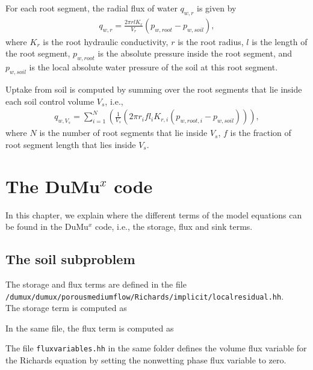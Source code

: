 For each root segment, the radial flux of water $q_{w,r}$ is given by 
\begin{eqnarray}
q_{w,r} = \frac{2 \pi r l K_r}{V_r} (p_{w,root}-p_{w,soil}),
\end{eqnarray}
where $K_r$ is the root hydraulic conductivity, $r$ is the root radius, $l$ is the length of the root segment, $p_{w,root}$ is the absolute pressure inside the root segment, and $p_{w,soil}$ is the local absolute water pressure of the soil at this root segment. 

Uptake from soil is computed by summing over the root segments that lie inside each soil control volume $V_s$, i.e.,
\begin{eqnarray}
q_{w,V_s} = \sum_{i=1}^{N}\left(\frac{1}{V_s}(2 \pi r_i f l_i K_{r,i} (p_{w,root,i}-p_{w,soil})) \right),
\end{eqnarray}
where $N$ is the number of root segments that lie inside $V_s$, $f$ is the fraction of root segment length that lies inside $V_s$. 

\section*{The DuMu$^x$ code}
In this chapter, we explain where the different terms of the model equations can be found in the DuMu$^x$ code, i.e., the storage, flux and sink terms. 

\subsection*{The soil subproblem}
The storage and flux terms are defined in the file \\
\verb+/dumux/dumux/porousmediumflow/Richards/implicit/localresidual.hh+.\\
The storage term is computed as
		

In the same file, the flux term is computed as 	
												

The file \verb+fluxvariables.hh+ in the same folder defines the volume flux variable for the Richards equation by setting the nonwetting phase flux variable to zero. 
	

